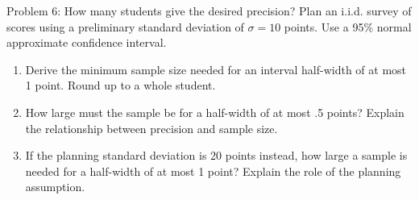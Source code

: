 \documentclass[notes,10pt, aspectratio=169]{beamer}
\newif\ifshowsolutions
\newcommand{\answerpart}[1]{\textcolor{blue}{\textbf{#1.}}\,}
\begin{document}
\begin{frame}{Problem 6: How many students give the desired precision?}
Plan an i.i.d. survey of scores using a preliminary standard deviation of $\sigma=10$ points. Use a 95\% normal approximate confidence interval.
\begin{enumerate}
\setlength{\itemsep}{10pt}
\item Derive the minimum sample size needed for an interval half-width of at most 1 point. Round up to a whole student.
\item How large must the sample be for a half-width of at most .5 points? Explain the relationship between precision and sample size.
\item If the planning standard deviation is 20 points instead, how large a sample is needed for a half-width of at most 1 point? Explain the role of the planning assumption.
\end{enumerate}
\end{frame}

\ifshowsolutions
\begin{frame}{Solution 6: Sample size for a target half-width}
\small
\answerpart{1}The planning standard error and interval half-width are
\[
SE(\overline Y)=\sqrt{\frac{\sigma^2}{n}}=\frac{\sigma}{\sqrt n},
\qquad m_n=1.96\frac{\sigma}{\sqrt n}.
\]
For $m_n\leq m$, solve and round up:
\[
n\geq\left(\frac{1.96\sigma}{m}\right)^2
\quad\Longrightarrow\quad
n_{\min}=\left\lceil\left(\frac{1.96\sigma}{m}\right)^2\right\rceil.
\]
\[
\sigma=10,\;m=1:
\quad n_{\min}=\lceil(19.6)^2\rceil=\lceil384.16\rceil=\boxed{385}.
\]
\answerpart{2}For $\sigma=10$ and $m=.5$,
\[
n_{\min}=\lceil(1.96\cdot10/.5)^2\rceil
=\lceil1536.64\rceil=\boxed{1537}.
\]
Halving the target half-width multiplies required $n$ by four before rounding.
\vspace{6pt}

\answerpart{3}For $\sigma=20$ and $m=1$, $n_{\min}=\lceil(39.2)^2\rceil=\boxed{1537}$.
Doubling $\sigma$ also multiplies required $n$ by four. Realized precision depends on how well the planning value describes the population.
\end{frame}
\fi
\end{document}
